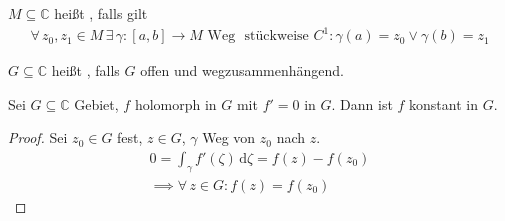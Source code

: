 \begin{theorem}[Definition]
  \begin{enum-arab}
    \item $M \subseteq \mathbb{C}$ heißt , falls gilt
    \begin{align*}
      \forall \, z_0,z_1 \in M \, \exists \, \gamma:[a,b] \to M \text{ Weg } \text{ stückweise } C^1 : \gamma(a) = z_0 \lor \gamma(b) = z_1
    \end{align*}
    \item $G \subseteq \mathbb{C}$ heißt , falls $G$ offen und wegzusammenhängend.
  \end{enum-arab}
\end{theorem}

\begin{theorem}[Satz]
  Sei $G \subseteq \mathbb{C}$ Gebiet, $f$ holomorph in $G$ mit $f' = 0$ in $G$. Dann ist $f$ konstant in $G$.
  
  \begin{proof}
    Sei $z_0 \in G$ fest, $z \in G$, $\gamma$ Weg von $z_0$ nach $z$.
    \begin{gather*}
      0 = \int_{\gamma} f'(\zeta) \, \mathrm{d}\zeta = f(z) - f(z_0) \\
      \implies \forall \, z \in G : f(z) = f(z_0)
    \end{gather*}
  \end{proof}
\end{theorem}

